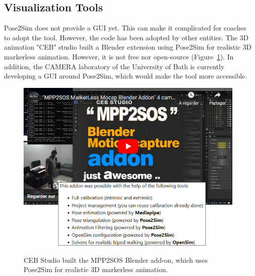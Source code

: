 \subsection{Visualization Tools}\label{subsec:viztools}

Pose2Sim does not provide a GUI yet. This can make it complicated for coaches to adopt the tool. However, the code has been adopted by other entities. The 3D animation "CEB" studio built a Blender \cite{Blender1998} extension using Pose2Sim for realistic 3D markerless animation. However, it is not free nor open-source \cite{Barreto2022} (Figure~\ref{fig_mpp2sos}). In addition, the CAMERA laboratory of the University of Bath is currently developing a GUI around Pose2Sim, which would make the tool more accessible. 

\begin{figure}[hbtp]
      \centering
      \def\svgwidth{1\columnwidth}
      \fontsize{10pt}{10pt}\selectfont
      \href{https://blendermarket.com/products/mocap-mpp2soss}{
            \includegraphics[width=1\linewidth]{"../Chap3/Figures/Fig_MPP2SOS.png"}
      }
      \caption{CEB Studio built the MPP2SOS Blender add-on, which uses Pose2Sim for realistic 3D markerless animation.}
      \label{fig_mpp2sos}
\end{figure}

